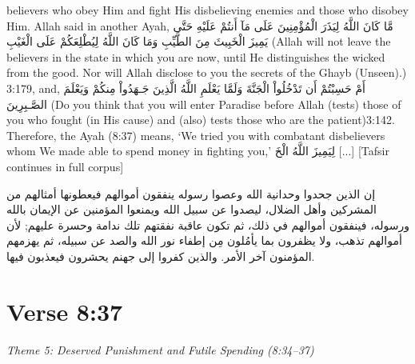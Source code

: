 \documentclass[11pt,a4paper,openany]{book}
\let\textAR\textarabic
\begin{document}
\begin{tafsirbox}
believers who obey Him and fight His disbelieving enemies and those who disobey Him. Allah said in another Ayah, \textAR{مَّا} \textAR{كَانَ} \textAR{اللَّهُ} \textAR{لِيَذَرَ} \textAR{الْمُؤْمِنِينَ} \textAR{عَلَى} \textAR{مَآ} \textAR{أَنتُمْ} \textAR{عَلَيْهِ} \textAR{حَتَّى} \textAR{يَمِيزَ} \textAR{الْخَبِيثَ} \textAR{مِنَ} \textAR{الطَّيِّبِ} \textAR{وَمَا} \textAR{كَانَ} \textAR{اللَّهُ} \textAR{لِيُطْلِعَكُمْ} \textAR{عَلَى} \textAR{الْغَيْبِ} (Allah will not leave the believers in the state in which you are now, until He distinguishes the wicked from the good. Nor will Allah disclose to you the secrets of the Ghayb (Unseen).) 3:179, and, \textAR{أَمْ} \textAR{حَسِبْتُمْ} \textAR{أَن} \textAR{تَدْخُلُواْ} \textAR{الْجَنَّةَ} \textAR{وَلَمَّا} \textAR{يَعْلَمِ} \textAR{اللَّهُ} \textAR{الَّذِينَ} \textAR{جَـهَدُواْ} \textAR{مِنكُمْ} \textAR{وَيَعْلَمَ} \textAR{الصَّـبِرِينَ} (Do you think that you will enter Paradise before Allah (tests) those of you who fought (in His cause) and (also) tests those who are the patient)3:142. Therefore, the Ayah (8:37) means, `We tried you with combatant disbelievers whom We made able to spend money in fighting you,' \textAR{لِيَمِيزَ} \textAR{اللَّهُ} \textAR{الْخَ} [...] [Tafsir continues in full corpus]
\end{tafsirbox}


\begin{muyassarbox}
\textAR{إن الذين جحدوا وحدانية الله وعصوا رسوله ينفقون أموالهم فيعطونها أمثالهم من المشركين وأهل الضلال، ليصدوا عن سبيل الله ويمنعوا المؤمنين عن الإيمان بالله ورسوله، فينفقون أموالهم في ذلك، ثم تكون عاقبة نفقتهم تلك ندامة وحسرة عليهم; لأن أموالهم تذهب، ولا يظفرون بما يأمُلون مِن إطفاء نور الله والصد عن سبيله، ثم يهزمهم المؤمنون آخر الأمر. والذين كفروا إلى جهنم يحشرون فيعذبون فيها.}
\end{muyassarbox}


\newpage

\section{Verse 8:37}
{\small\color{accent2}\itshape Theme 5: Deserved Punishment and Futile Spending (8:34--37)}
\end{document}
